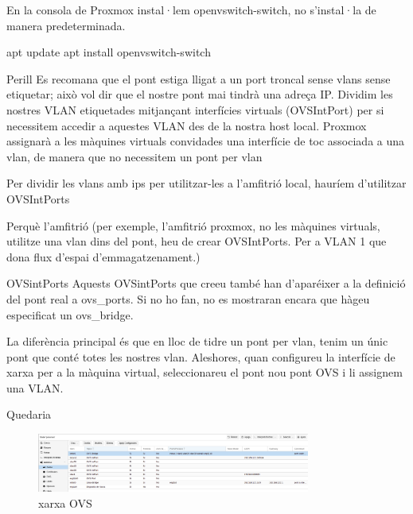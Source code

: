 \documentclass[
  10pt,
]{krantz}
\newenvironment{Shaded}{\begin{snugshade}}{\end{snugshade}}
\newcommand{\ExtensionTok}[1]{#1}
\newcommand{\NormalTok}[1]{#1}
\begin{document}
En la consola de Proxmox instal·lem openvswitch-switch, no s'instal·la de manera predeterminada.

\begin{Shaded}
\begin{Highlighting}[]
\ExtensionTok{apt}\NormalTok{ update}
\ExtensionTok{apt}\NormalTok{ install openvswitch{-}switch}
\end{Highlighting}
\end{Shaded}

\begin{rmdwarn}{Perill}
Es recomana que el pont estiga lligat a un port troncal sense vlans sense etiquetar; això vol dir que el nostre pont mai tindrà una adreça IP. Dividim les nostres VLAN etiquetades mitjançant interfícies virtuals (OVSIntPort) per si necessitem accedir a aquestes VLAN des de la nostra host local. Proxmox assignarà a les màquines virtuals convidades una interfície de toc associada a una vlan, de manera que no necessitem un pont per vlan

\end{rmdwarn}

Per dividir les vlans amb ips per utilitzar-les a l'amfitrió local, hauríem d'utilitzar OVSIntPorts

Perquè l'amfitrió (per exemple, l'amfitrió proxmox, no les màquines virtuals, utilitze una vlan dins del pont, heu de crear OVSIntPorts. Per a VLAN 1 que dona flux d'espai d'emmagatzenament.)

\begin{rmdcuidao}{OVSintPorts}
Aquests OVSintPorts que creeu també han d'aparéixer a la definició del pont real a ovs\_ports. Si no ho fan, no es mostraran encara que hàgeu especificat un ovs\_bridge.

\end{rmdcuidao}

La diferència principal és que en lloc de tidre un pont per vlan, tenim un únic pont que conté totes les nostres vlan. Aleshores, quan configureu la interfície de xarxa per a la màquina virtual, seleccionareu el pont nou pont OVS i li assignem una VLAN.

Quedaria

\begin{figure}
\centering
\includegraphics[width=0.8\textwidth,height=\textheight]{imatges/proxmox/xarxa_ovs.png}
\caption{xarxa OVS}
\end{figure}
\end{document}
